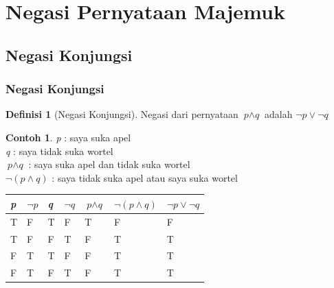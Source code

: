 \documentclass[handout]{beamer}
\theoremstyle{definition}
\newtheorem{definisi}[theorem]{Definisi}
\theoremstyle{example}
\newtheorem{contoh}[theorem]{Contoh}
\begin{document}
\section{Negasi Pernyataan Majemuk}
\subsection{Negasi Konjungsi}
\begin{frame}
	\frametitle{Negasi Konjungsi}
    	\begin{definisi}[Negasi Konjungsi]
    		Negasi dari pernyataan $\textit{p}\wedge\textit{q}$  adalah $\neg\textit{p}\vee\neg\textit{q}$    		 	
    	\end{definisi}
    	\begin{contoh}
    		\textit{p} : saya suka apel \\
    		\textit{q} : saya tidak suka wortel \\
    		$\textit{p}\wedge\textit{q}$ : saya suka apel dan tidak suka wortel\\
    		$\neg(\textit{p}\wedge\textit{q})$ : saya tidak suka apel atau saya suka wortel	\\
    		
    		\begin{tabular}{ | l | l | l | l | l | l | l |}
    			\hline
    			\textit{p} & $\neg\textit{p}$ & \textit{q} & $\neg\textit{q}$ & $\textit{p}\wedge\textit{q}$ & $\neg(\textit{p}\wedge\textit{q})$ & $\neg\textit{p}\vee\neg\textit{q}$ \\ \hline
    			T & F & T & F & T & F & F\\ \hline
    			T & F & F & T & F & T & T \\ \hline
    			F & T & T & F & F & T & T\\ \hline
    			F & T & F & T & F & T & T\\     		 
    			\hline
    		\end{tabular}
    	\end{contoh}
\end{frame}
\end{document}
